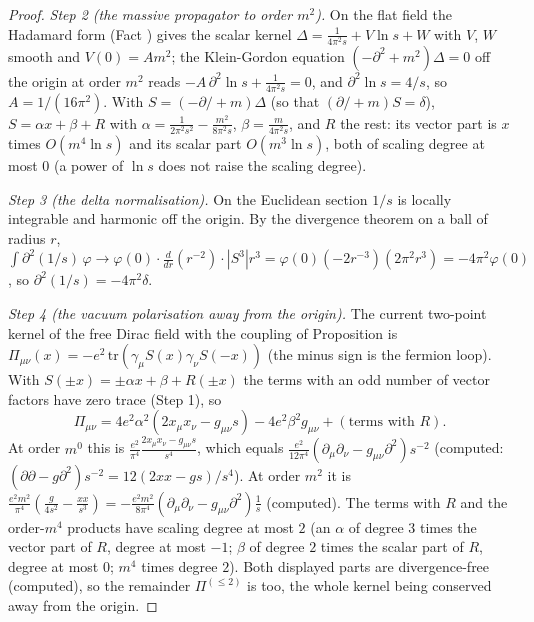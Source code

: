 \begin{proof}
\emph{Step 2 (the massive propagator to order $m^{2}$).} On the flat field the Hadamard form (Fact ) gives the scalar kernel $\Delta = \frac{1}{4\pi^{2}s} + V\ln s + W$ with $V$, $W$ smooth and $V(0) = Am^{2}$; the Klein-Gordon equation $(-\partial^{2} + m^{2})\Delta = 0$ off the origin at order $m^{2}$ reads $-A\,\partial^{2}\ln s + \frac{1}{4\pi^{2}s} = 0$, and $\partial^{2}\ln s = 4/s$, so $A = 1/(16\pi^{2})$. With $S = (-\partial\!\!\!/ + m)\Delta$ (so that $(\partial\!\!\!/ + m)S = \delta$), $S = \alpha x + \beta + R$ with $\alpha = \frac{1}{2\pi^{2}s^{2}} - \frac{m^{2}}{8\pi^{2}s}$, $\beta = \frac{m}{4\pi^{2}s}$, and $R$ the rest: its vector part is $x$ times $O(m^{4}\ln s)$ and its scalar part $O(m^{3}\ln s)$, both of scaling degree at most $0$ (a power of $\ln s$ does not raise the scaling degree).

\emph{Step 3 (the delta normalisation).} On the Euclidean section $1/s$ is locally integrable and harmonic off the origin. By the divergence theorem on a ball of radius $r$, $\int\partial^{2}(1/s)\,\varphi \to \varphi(0)\cdot\frac{d}{dr}(r^{-2})\cdot|S^{3}|r^{3} = \varphi(0)(-2r^{-3})(2\pi^{2}r^{3}) = -4\pi^{2}\varphi(0)$, so $\partial^{2}(1/s) = -4\pi^{2}\delta$.

\emph{Step 4 (the vacuum polarisation away from the origin).} The current two-point kernel of the free Dirac field with the coupling of Proposition  is $\Pi_{\mu\nu}(x) = -e^{2}\,\mathrm{tr}(\gamma_{\mu}S(x)\gamma_{\nu}S(-x))$ (the minus sign is the fermion loop). With $S(\pm x) = \pm\alpha x + \beta + R(\pm x)$ the terms with an odd number of vector factors have zero trace (Step 1), so
\[
\Pi_{\mu\nu} = 4e^{2}\alpha^{2}(2x_{\mu}x_{\nu} - g_{\mu\nu}s) - 4e^{2}\beta^{2}g_{\mu\nu} + (\text{terms with } R).
\]
At order $m^{0}$ this is $\frac{e^{2}}{\pi^{4}}\frac{2x_{\mu}x_{\nu} - g_{\mu\nu}s}{s^{4}}$, which equals $\frac{e^{2}}{12\pi^{4}}(\partial_{\mu}\partial_{\nu} - g_{\mu\nu}\partial^{2})s^{-2}$ (computed: $(\partial\partial - g\partial^{2})s^{-2} = 12(2xx - gs)/s^{4}$). At order $m^{2}$ it is $\frac{e^{2}m^{2}}{\pi^{4}}(\frac{g}{4s^{2}} - \frac{xx}{s^{3}}) = -\frac{e^{2}m^{2}}{8\pi^{4}}(\partial_{\mu}\partial_{\nu} - g_{\mu\nu}\partial^{2})\frac1s$ (computed). The terms with $R$ and the order-$m^{4}$ products have scaling degree at most $2$ (an $\alpha$ of degree $3$ times the vector part of $R$, degree at most $-1$; $\beta$ of degree $2$ times the scalar part of $R$, degree at most $0$; $m^{4}$ times degree $2$). Both displayed parts are divergence-free (computed), so the remainder $\Pi^{(\le 2)}$ is too, the whole kernel being conserved away from the origin.


\end{proof}
